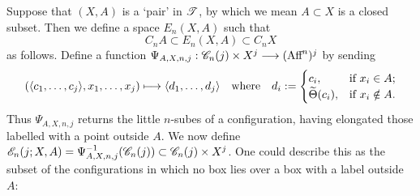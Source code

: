 \documentclass[11pt]{article}
\newcommand{\Aff}{\textup{Aff}}
\newcommand{\labsq}[6][0]{
\draw (#2+#1,#3)--(#4+#1,#3)--(#4+#1,#5)--(#2+#1,#5)-- cycle;
\path (.5*#2+.5*#4+#1,.5*#3+.5*#5) node[font=\scriptsize] {#6};
}
\begin{document}
\begin{chapter4-6}
Suppose that $(X,A)$ is a `pair' in $\scrT$, by which we mean $A\subset X$ is a closed subset. Then we define a space $E_n(X,A)$ such that
\[C_nA\subset E_n(X,A)\subset C_nX\]
as follows. Define a function $\Psi_{A,X,n,j}:\scrC_n(j)\times X^j\to(\Aff^n)^j$ by sending
\[(\langle c_1,\ldots,c_j\rangle,x_1,\ldots,x_j)\mapsto\langle d_1,\ldots,d_j\rangle
\textup{\quad where\quad }d_i:=\begin{cases}
c_i,&\textup{if }x_i\in A;\\
\widetilde{\Theta}(c_i),&\textup{if }x_i\notin A.
\end{cases}\]
Thus $\Psi_{A,X,n,j}$ returns the little $n$-subes of a configuration, having elongated those labelled with a point outside $A$. We now define $\scrE_n(j;X,A)=\Psi_{A,X,n,j}^{-1}(\scrC_n(j))\subset \scrC_n(j)\times X^j$. One could describe this as the subset of the configurations in which no box lies over a box with a label outside $A$:
\begin{center}
\end{center}
\end{chapter4-6}
\end{document}
